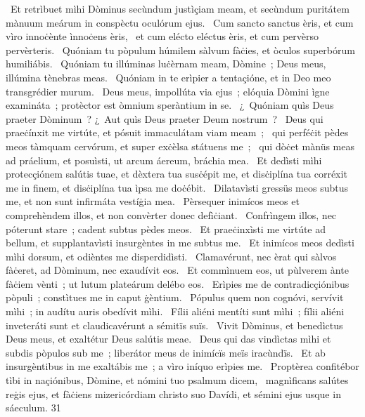 {~Et retrìbuet mìhi Dòminus secùndum justìçiam meam, et secùndum puritátem mànuum meárum in conspèctu oculórum ejus.
~Cum sancto sanctus èris, et cum vìro innoċènte ìnnoċens èris,
~et cum elécto eléctus èris, et cum pervèrso pervèrteris.
~Quóniam tu pòpulum húmilem sàlvum fàċies, et òculos superbórum humiliábis.
~Quóniam tu illúminas luċèrnam meam, Dòmine~; Deus meus, illúmina tènebras meas.
~Quóniam in te erìpier a tentaçióne, et in Deo meo transgrédier murum.
~Deus meus, impollúta via ejus~; elóquia Dòmini ìgne examináta~; protèctor est òmnium speràntium in se.
~¿~Quóniam quìs Deus praeter Dòminum~? ¿~Aut quìs Deus praeter Deum nostrum~?
~Deus qui praeċínxit me virtúte, et pósuit immaculátam viam meam~;
~qui perféċit pèdes meos tàmquam cervórum, et super exċèlsa státuens me~;
~qui dòċet mànüs meas ad práelium, et posuìsti, ut arcum áereum, bráchia mea.
~Et dedìsti mìhi protecçiónem salútis tuae, et dèxtera tua susċépit me, et disċiplína tua corréxit me in finem, et disċiplína tua ìpsa me doċébit.
~Dilatavìsti gressüs meos subtus me, et non sunt infirmáta vestíġia mea.
~Pèrsequer inimícos meos et comprehèndem illos, et non convèrter donec defìċiant.
~Confrìngem illos, nec póterunt stare~; cadent subtus pèdes meos.
~Et praeċinxìsti me virtúte ad bellum, et supplantavìsti insurgèntes in me subtus me.
~Et inimícos meos dedìsti mìhi dorsum, et odièntes me disperdidìsti.
~Clamavérunt, nec èrat qui sàlvos fàċeret, ad Dòminum, nec exaudívit eos.
~Et commìnuem eos, ut pùlverem ànte fàċiem vènti~; ut lutum plateárum delébo eos.
~Erìpies me de contradicçiónibus pòpuli~; constìtues me in caput ġèntium.
~Pópulus quem non cognóvi, servívit mìhi~; in audítu auris obedívit mìhi.
~Fílii aliéni mentíti sunt mìhi~; fílii aliéni inveteráti sunt et claudicavérunt a sémitïs suïs.
~Vivit Dòminus, et benedìctus Deus meus, et exaltétur Deus salútis meae.
~Deus qui das vindìctas mìhi et subdis pòpulos sub me~; liberátor meus de inimícïs meïs iracùndïs.
~Et ab insurgèntibus in me exaltábis me~; a vìro iníquo erìpies me.
~Proptèrea confitébor tìbi in naçiónibus, Dòmine, et nómini tuo psalmum dicem,
~magnìficans salútes reġis ejus, et fàċiens mizericórdiam christo suo Davídi, et sémini ejus usque in sáeculum.
}
{3}{1}
